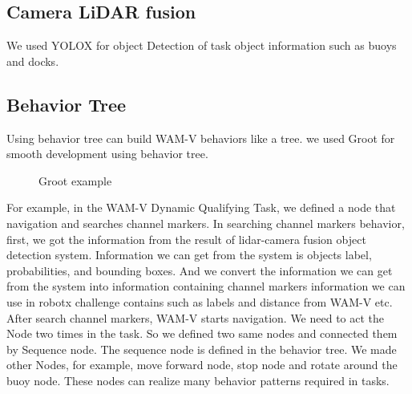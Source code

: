 \documentclass[lettersize,journal]{IEEEtran}
\begin{document}
\subsection{Camera LiDAR fusion}
We used YOLOX\cite{YOLOX} for object Detection of task object information such as buoys and docks.

\subsection{Behavior Tree}
Using behavior tree can build WAM-V behaviors like a tree.  
we used Groot for smooth development using behavior tree.

\begin{figure}[h]
  \begin{center}
  \end{center}
  \caption{Groot example}
  \label{fig:Groot}
\end{figure}

For example, in the WAM-V Dynamic Qualifying Task, 
we defined a node that navigation and searches channel markers.
In searching channel markers behavior, first, we got the information from the result of lidar-camera fusion object detection system. 
Information we can get from the system is objects label, probabilities, and bounding boxes.
And we convert the information we can get from the system into information containing channel markers information 
we can use in robotx challenge contains such as labels and distance from WAM-V etc.
After search channel markers, WAM-V starts navigation.
We need to act the Node two times in the task. So we defined two same nodes and connected them by Sequence node. 
The sequence node is defined in the behavior tree.
We made other Nodes, for example, move forward node, stop node and rotate around the buoy node.
These nodes can realize many behavior patterns required in tasks.
\end{document}
